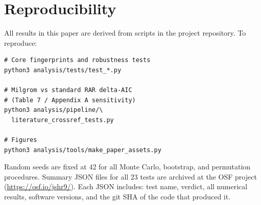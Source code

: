 \documentclass[twocolumn,twocolappendix]{aastex631}
\begin{document}
\section{Reproducibility} \label{app:repro}

All results in this paper are derived from scripts in the project
repository. To reproduce:

\begin{verbatim}
# Core fingerprints and robustness tests
python3 analysis/tests/test_*.py

# Milgrom vs standard RAR delta-AIC
# (Table 7 / Appendix A sensitivity)
python3 analysis/pipeline/\
  literature_crossref_tests.py

# Figures
python3 analysis/tools/make_paper_assets.py
\end{verbatim}

Random seeds are fixed at 42 for all Monte Carlo, bootstrap, and
permutation procedures. Summary JSON files for all 23 tests are archived
at the OSF project (\url{https://osf.io/jshr9/}). Each JSON includes:
test name, verdict, all numerical results, software versions, and the git
SHA of the code that produced it.


\end{document}
